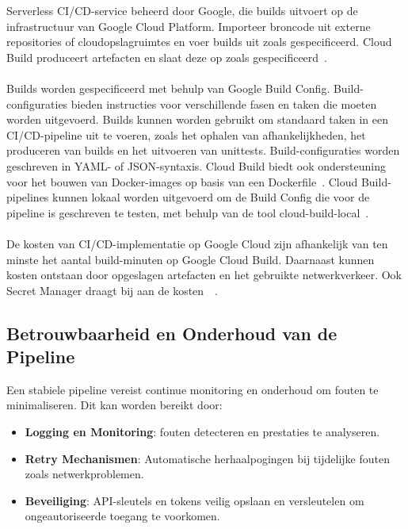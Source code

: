 Serverless CI/CD-service beheerd door Google, die builds uitvoert op de infrastructuur van Google Cloud Platform. Importeer broncode uit externe repositories of cloudopslagruimtes en voer builds uit zoals gespecificeerd. Cloud Build produceert artefacten en slaat deze op zoals gespecificeerd~\autocite{googleCloudBuildOverview}.
\\\\
Builds worden gespecificeerd met behulp van Google Build Config. Build-configuraties bieden instructies voor verschillende fasen en taken die moeten worden uitgevoerd. Builds kunnen worden gebruikt om standaard taken in een CI/CD-pipeline uit te voeren, zoals het ophalen van afhankelijkheden, het produceren van builds en het uitvoeren van unittests. Build-configuraties worden geschreven in YAML- of JSON-syntaxis. Cloud Build biedt ook ondersteuning voor het bouwen van Docker-images op basis van een Dockerfile~\autocite{googleQuickstartBuild}. Cloud Build-pipelines kunnen lokaal worden uitgevoerd om de Build Config die voor de pipeline is geschreven te testen, met behulp van de tool cloud-build-local~\autocite{googleCloudBuildOverview}.
\\\\
De kosten van CI/CD-implementatie op Google Cloud zijn afhankelijk van ten minste het aantal build-minuten op Google Cloud Build. Daarnaast kunnen kosten ontstaan door opgeslagen artefacten en het gebruikte netwerkverkeer. Ook Secret Manager draagt bij aan de kosten~\autocite{googleCloudBuildPricing}~\autocite{googleSecretManagerPricing}.

\subsection{Betrouwbaarheid en Onderhoud van de Pipeline}
Een stabiele pipeline vereist continue monitoring en onderhoud om fouten te minimaliseren. Dit kan worden bereikt door:

\begin{itemize}
    \item \textbf{Logging en Monitoring}: fouten detecteren en prestaties te analyseren.
    \item \textbf{Retry Mechanismen}: Automatische herhaalpogingen bij tijdelijke fouten zoals netwerkproblemen.
    \item \textbf{Beveiliging}: API-sleutels en tokens veilig opslaan en versleutelen om ongeautoriseerde toegang te voorkomen.
\end{itemize}

